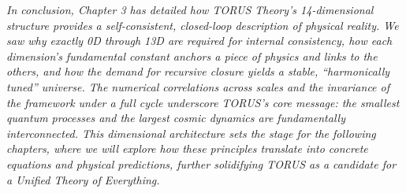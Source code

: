 \documentclass[]{article}
\begin{document}
\emph{In conclusion, Chapter 3 has detailed how TORUS Theory's
14-dimensional structure provides a self-consistent, closed-loop
description of physical reality. We saw why exactly 0D through 13D are
required for internal consistency, how each dimension's fundamental
constant anchors a piece of physics and links to the others, and how the
demand for recursive closure yields a stable, ``harmonically tuned''
universe. The numerical correlations across scales and the invariance of
the framework under a full cycle underscore TORUS's core message: the
smallest quantum processes and the largest cosmic dynamics are
fundamentally interconnected. This dimensional architecture sets the
stage for the following chapters, where we will explore how these
principles translate into concrete equations and physical predictions,
further solidifying TORUS as a candidate for a Unified Theory of
Everything.}
\end{document}
